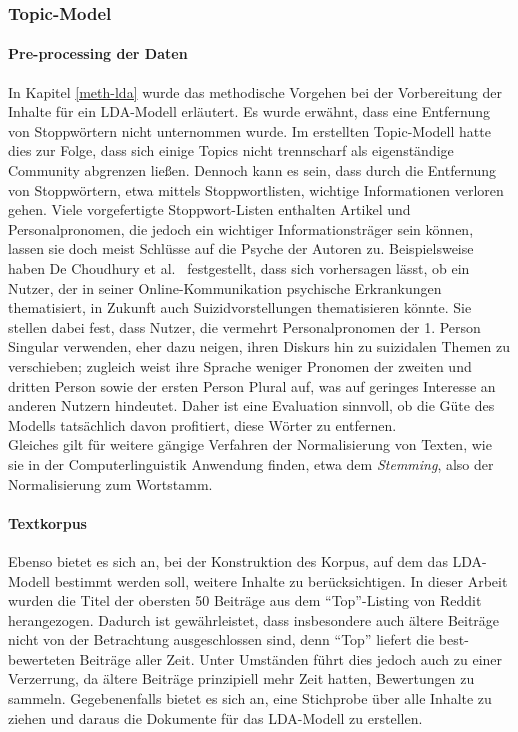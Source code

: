 \documentclass[11pt,a4paper,twoside]{article}
\let\oldpar\paragraph
\renewcommand{\paragraph}{\oldpar*}
\begin{document}
\hypertarget{topic-model}{%
\subsubsection{Topic-Model}\label{topic-model}}

\hypertarget{pre-processing-der-daten}{%
\paragraph{Pre-processing der Daten}\label{pre-processing-der-daten}}

In Kapitel \ref{meth-lda} wurde das methodische Vorgehen bei der
Vorbereitung der Inhalte für ein LDA-Modell erläutert. Es wurde erwähnt,
dass eine Entfernung von Stoppwörtern nicht unternommen wurde. Im
erstellten Topic-Modell hatte dies zur Folge, dass sich einige Topics
nicht trennscharf als eigenständige Community abgrenzen ließen. Dennoch
kann es sein, dass durch die Entfernung von Stoppwörtern, etwa mittels
Stoppwortlisten, wichtige Informationen verloren gehen. Viele
vorgefertigte Stoppwort-Listen enthalten Artikel und Personalpronomen,
die jedoch ein wichtiger Informationsträger sein können, lassen sie doch
meist Schlüsse auf die Psyche der Autoren zu. Beispielsweise haben De
Choudhury et al.~\autocite{DeChoudhury2016} festgestellt, dass sich
vorhersagen lässt, ob ein Nutzer, der in seiner Online-Kommunikation
psychische Erkrankungen thematisiert, in Zukunft auch
Suizidvorstellungen thematisieren könnte. Sie stellen dabei fest, dass
Nutzer, die vermehrt Personalpronomen der 1. Person Singular verwenden,
eher dazu neigen, ihren Diskurs hin zu suizidalen Themen zu verschieben;
zugleich weist ihre Sprache weniger Pronomen der zweiten und dritten
Person sowie der ersten Person Plural auf, was auf geringes Interesse an
anderen Nutzern hindeutet. Daher ist eine Evaluation sinnvoll, ob die
Güte des Modells tatsächlich davon profitiert, diese Wörter zu
entfernen.\\
Gleiches gilt für weitere gängige Verfahren der Normalisierung von
Texten, wie sie in der Computerlinguistik Anwendung finden, etwa dem
\emph{Stemming}, also der Normalisierung zum Wortstamm.

\hypertarget{textkorpus}{%
\paragraph{Textkorpus}\label{textkorpus}}

Ebenso bietet es sich an, bei der Konstruktion des Korpus, auf dem das
LDA-Modell bestimmt werden soll, weitere Inhalte zu berücksichtigen. In
dieser Arbeit wurden die Titel der obersten 50 Beiträge aus dem
\enquote{Top}-Listing von Reddit herangezogen. Dadurch ist
gewährleistet, dass insbesondere auch ältere Beiträge nicht von der
Betrachtung ausgeschlossen sind, denn \enquote{Top} liefert die
best-bewerteten Beiträge aller Zeit. Unter Umständen führt dies jedoch
auch zu einer Verzerrung, da ältere Beiträge prinzipiell mehr Zeit
hatten, Bewertungen zu sammeln. Gegebenenfalls bietet es sich an, eine
Stichprobe über alle Inhalte zu ziehen und daraus die Dokumente für das
LDA-Modell zu erstellen.
\end{document}
